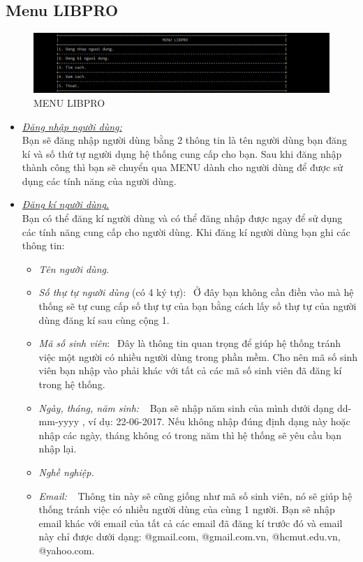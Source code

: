 \documentclass[16pt,a4paper,oneside]{article}
\begin{document}
\subsection{Menu LIBPRO}
\begin{figure}[htp]
	\begin{center}
		\includegraphics[width=18cm]{Images/menu_libpro.png}
		\caption{MENU LIBPRO}
	\end{center}
\end{figure}
	\renewcommand{\labelitemi}{$\blacksquare$}
\begin{itemize}
	\item \underline{\textit{Đăng nhập người dùng:}}\\
	Bạn sẽ đăng nhập người dùng bằng 2 thông tin là tên người dùng bạn đăng kí và số thứ tự người dụng hệ thống cung cấp cho bạn. Sau khi đăng nhập thành công thì bạn sẽ chuyển qua MENU dành cho người dùng để được sử dụng các tính năng của người dùng.
	\item \underline{\textit{Đăng kí người dùng.}}\\
	Bạn có thể đăng kí người dùng và có thể đăng nhập được ngay để sử dụng các tính năng cung cấp cho người dùng. Khi đăng kí người dùng bạn ghi các thông tin:
	\begin{itemize}
		\item \textit{Tên người dùng}.
		\item \textit{Số thự tự người dùng} (có 4 ký tự):$~~$ Ở đây bạn không cần điền vào mà hệ thống sẽ tự cung cấp số thự tự của bạn bằng cách lấy số thự tự của người dùng đăng kí sau cùng cộng 1.
		\item \textit{Mã số sinh viên}:$~~$ Đây là thông tin quan trọng để giúp hệ thống tránh việc một người có nhiều người dùng trong phần mềm. Cho nên mã số sinh viên bạn nhập vào phải khác với tất cả các mã số sinh viên đã đăng kí trong hệ thống.
		\item \textit{Ngày, tháng, năm sinh: }$~~$ Bạn sẽ nhập năm sinh của mình dưới dạng dd-mm-yyyy , ví dụ: 22-06-2017. Nếu không nhập đúng định dạng này hoặc nhập các ngày, tháng không có trong năm thì hệ thống sẽ yêu cầu bạn nhập lại.
		\item \textit{Nghề nghiệp.}
		\item \textit{Email: }$~~$ Thông tin này sẽ cũng giống như mã số sinh viên, nó sẽ giúp hệ thống tránh việc có nhiều người dùng của cùng 1 người. Bạn sẽ nhập email khác với email của tất cả các email đã đăng kí trước đó và email này chỉ được dưới dạng: @gmail.com, @gmail.com.vn, @hcmut.edu.vn, @yahoo.com.

\end{itemize}
\end{itemize}
\end{document}
